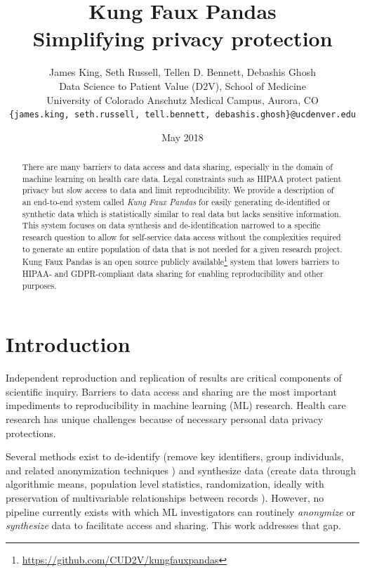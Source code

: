\documentclass{article}
\title{%
  Kung Faux Pandas \\
  \large Simplifying privacy protection
  }
\author{
  James King, Seth Russell, Tellen D. Bennett, Debashis Ghosh\\
  Data Science to Patient Value (D2V), School of Medicine\\
  University of Colorado Anschutz Medical Campus, Aurora, CO\\
  \texttt{\{james.king, seth.russell, tell.bennett, debashis.ghosh\}@ucdenver.edu}}
\date{May 2018}
\begin{document}

\maketitle

\begin{abstract}
There are many barriers to data access and data sharing, especially in the domain of machine learning on health care data. Legal constraints such as HIPAA protect patient privacy but slow access to data and limit reproducibility. We provide a description of an end-to-end system called \emph{Kung Faux Pandas} for easily generating de-identified or synthetic data which is statistically similar to real data but lacks sensitive information. This system focuses on data synthesis and de-identification narrowed to a specific research question to allow for self-service data access without the complexities required to generate an entire population of data that is not needed for a given research project. Kung Faux Pandas is an open source publicly available\footnote{\url{https://github.com/CUD2V/kungfauxpandas}} system that lowers barriers to HIPAA- and GDPR-compliant data sharing for enabling reproducibility and other purposes.
\end{abstract}

\section{Introduction}

Independent reproduction and replication of results are critical components of scientific inquiry. Barriers to data access and sharing are the most important impediments to reproducibility in machine learning (ML) research. Health care research has unique challenges because of necessary personal data privacy protections.

Several methods exist to de-identify (remove key identifiers, group individuals, and related anonymization techniques \cite{hippapro}) and synthesize data (create data through algorithmic means, population level statistics, randomization, ideally with preservation of multivariable relationships between records \cite{walonoski_synthea_2018, patki_synthetic_2016, choi_generating_2017}). However, no pipeline currently exists with which ML investigators can routinely \emph{anonymize} or \emph{synthesize} data to facilitate access and sharing. This work addresses that gap.
\end{document}
